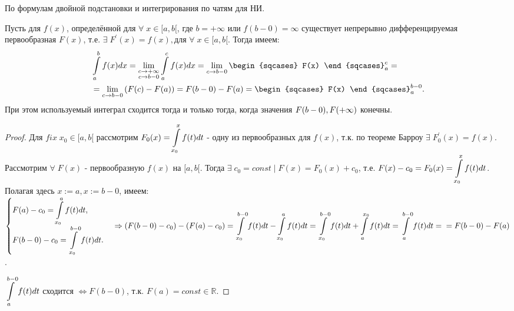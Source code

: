 \begin{plan}
\item По формулам двойной подстановки и интегрирования по чатям для НИ.
\end{plan}
\begin{theorem}
Пусть для $f(x)$, определённой для $\forall \; x \in [a, b[$, где $b = + \infty$ или $f(b - 0) = \infty$ существует непрерывно дифференцируемая первообразная $F(x)$, т.е. $\exists \; F^{'}(x) = f(x), \text{для }\forall \; x \in [a, b[$. Тогда имеем:
\begin{equation*}
\begin{split}
&\dint\limits_{a}^{b} f(x)dx = \lim\limitslimits{c \to + \infty}{c \to b-0} \dint\limits_{a}^{c} f(x)dx = \lim\limits_{c\to b-0} \begin{sqcases} F(x) \end{sqcases}^{c}_{a} = \\
& =\lim\limits_{c\to b-0} \left(F(c) - F(a)\right) = F(b-0) - F(a) = \begin{sqcases} F(x) \end{sqcases}^{b-0}_{a}.
\end{split}
\end{equation*}
При этом используемый интеграл сходится тогда и только тогда, когда значения $\linebreak F(b-0), F(+\infty)$ конечны.
\end{theorem}
\begin{proof}
	Для $fix \; x_0 \in [a,b[$ рассмотрим $F_0(x) = \displaystyle\int\limits_{x_0}^	{x}f(t)dt$ - одну из первообразных для $f(x)$, т.к. по теореме Барроу $\exists \; F_0^{'}(x) = f(x)$. Рассмотрим $\forall \; F(x)$ - первообразную $f(x)$ на $[a,b[$. Тогда $\exists \; c_0 = const \; | \; F(x) = F_0(x) + c_0$, т.е. $F(x) - c_0 = F_0(x) = \displaystyle\int\limits_{x_0}^{x}f(t)dt$. Полагая здесь $x := a, x := b-0$, имеем: \newline $\begin{cases}F(a) - c_0 = \dintl_{x_0}^{a} f(t)dt, \\ F(b-0) - c_0 = \dintl_{x_0}^{b-0} f(t)dt. \end{cases} \Rightarrow \left(F(b-0) - c_0\right) - \left(F(a) - c_0\right) = \dintl_{x_0}^{b-0} f(t)dt - \dintl_{x_0}^{a} f(t)dt = \dintl_{x_0}^{b-0} f(t)dt + \dintl_{a}^{x_0} f(t)dt = \dintl_{a}^{b-0} f(t)dt = \newline = F(b-0) - F(a)$.

	$\displaystyle\int\limits_{a}^{b-0} f(t)dt$ сходится $\Leftrightarrow F(b-0)$, т.к. $F(a) = const \in \mathbb{R}$.
\end{proof}
